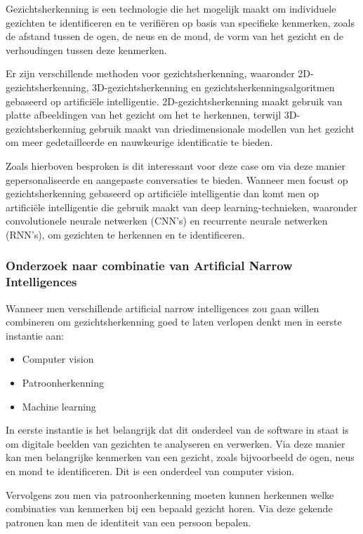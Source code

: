 Gezichtsherkenning is een technologie die het mogelijk maakt om individuele gezichten te identificeren en te verifiëren op basis van specifieke kenmerken, zoals de afstand tussen de ogen, de neus en de mond, de vorm van het gezicht en de verhoudingen tussen deze kenmerken.

Er zijn verschillende methoden voor gezichtsherkenning, waaronder 2D-gezichtsherkenning, 3D-gezichtsherkenning en gezichtsherkenningsalgoritmen gebaseerd op artificiële intelligentie. 2D-gezichtsherkenning maakt gebruik van platte afbeeldingen van het gezicht om het te herkennen, terwijl 3D-gezichtsherkenning gebruik maakt van driedimensionale modellen van het gezicht om meer gedetailleerde en nauwkeurige identificatie te bieden.

Zoals hierboven besproken is dit interessant voor deze case om via deze manier gepersonaliseerde en aangepaste conversaties te bieden. Wanneer men focust op gezichtsherkenning gebaseerd op artificiële intelligentie dan komt men op  artificiële intelligentie die gebruik maakt van deep learning-technieken, waaronder convolutionele neurale netwerken (CNN's) en recurrente neurale netwerken (RNN's), om gezichten te herkennen en te identificeren.

\subsubsection{Onderzoek naar combinatie van Artificial Narrow Intelligences}

Wanneer men verschillende artificial narrow intelligences zou gaan willen combineren om gezichtsherkenning goed te laten verlopen denkt men in eerste instantie aan:

\begin{itemize}
    \item Computer vision
    \item Patroonherkenning
    \item Machine learning
\end{itemize}

In eerste instantie is het belangrijk dat dit onderdeel van de software in staat is om digitale beelden van gezichten te analyseren en verwerken. Via deze manier kan men belangrijke kenmerken van een gezicht, zoals bijvoorbeeld de ogen, neus en mond te identificeren. Dit is een onderdeel van computer vision.

Vervolgens zou men via patroonherkenning moeten kunnen herkennen welke combinaties van kenmerken bij een bepaald gezicht horen. Via deze gekende patronen kan men de identiteit van een persoon bepalen.

